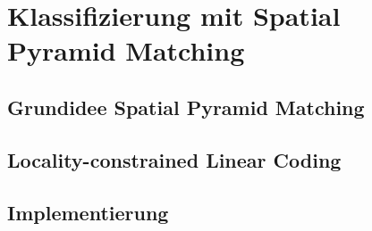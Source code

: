 \section{Klassifizierung mit Spatial Pyramid Matching}

\subsection{Grundidee Spatial Pyramid Matching}

\subsection{Locality-constrained Linear Coding}

\subsection{Implementierung}